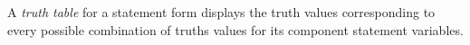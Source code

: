 \guard



\begin{defn}
\label{defn:truthTable}
  A \emph{truth table} for a statement form displays the truth values corresponding to every possible combination of truths values for its component statement variables.
\end{defn}
